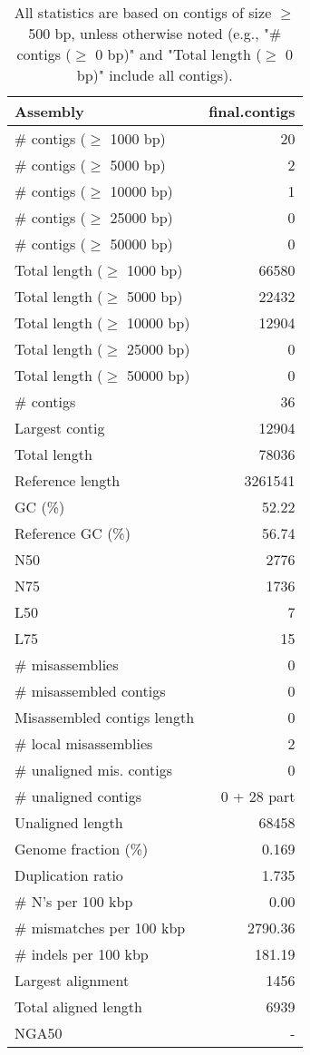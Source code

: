\documentclass[12pt,a4paper]{article}
\begin{document}
\begin{table}[ht]
\begin{center}
\caption{All statistics are based on contigs of size $\geq$ 500 bp, unless otherwise noted (e.g., "\# contigs ($\geq$ 0 bp)" and "Total length ($\geq$ 0 bp)" include all contigs).}
\begin{tabular}{|l*{1}{|r}|}
\hline
Assembly & final.contigs \\ \hline
\# contigs ($\geq$ 1000 bp) & 20 \\ \hline
\# contigs ($\geq$ 5000 bp) & 2 \\ \hline
\# contigs ($\geq$ 10000 bp) & 1 \\ \hline
\# contigs ($\geq$ 25000 bp) & 0 \\ \hline
\# contigs ($\geq$ 50000 bp) & 0 \\ \hline
Total length ($\geq$ 1000 bp) & 66580 \\ \hline
Total length ($\geq$ 5000 bp) & 22432 \\ \hline
Total length ($\geq$ 10000 bp) & 12904 \\ \hline
Total length ($\geq$ 25000 bp) & 0 \\ \hline
Total length ($\geq$ 50000 bp) & 0 \\ \hline
\# contigs & 36 \\ \hline
Largest contig & 12904 \\ \hline
Total length & 78036 \\ \hline
Reference length & 3261541 \\ \hline
GC (\%) & 52.22 \\ \hline
Reference GC (\%) & 56.74 \\ \hline
N50 & 2776 \\ \hline
N75 & 1736 \\ \hline
L50 & 7 \\ \hline
L75 & 15 \\ \hline
\# misassemblies & 0 \\ \hline
\# misassembled contigs & 0 \\ \hline
Misassembled contigs length & 0 \\ \hline
\# local misassemblies & 2 \\ \hline
\# unaligned mis. contigs & 0 \\ \hline
\# unaligned contigs & 0 + 28 part \\ \hline
Unaligned length & 68458 \\ \hline
Genome fraction (\%) & 0.169 \\ \hline
Duplication ratio & 1.735 \\ \hline
\# N's per 100 kbp & 0.00 \\ \hline
\# mismatches per 100 kbp & 2790.36 \\ \hline
\# indels per 100 kbp & 181.19 \\ \hline
Largest alignment & 1456 \\ \hline
Total aligned length & 6939 \\ \hline
NGA50 & - \\ \hline
\end{tabular}
\end{center}
\end{table}
\end{document}
